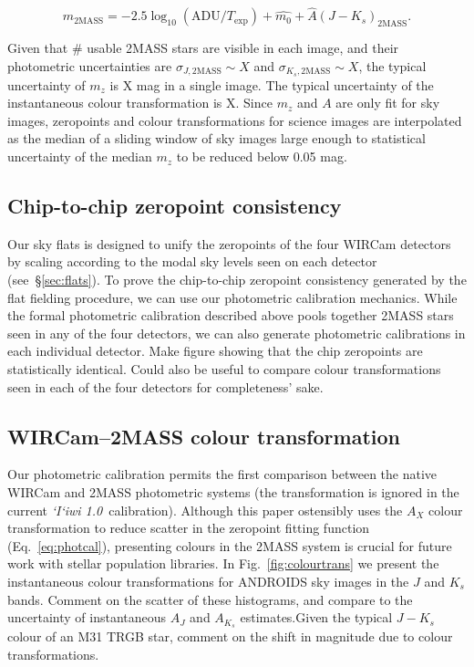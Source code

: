 \documentclass[iop]{emulateapj}
\newcommand{\sw}[1]{\textit{#1}} %
\newcommand{\iiwione}{\sw{`I`iwi 1.0}}
\newcommand{\todo}[1]{\textcolor{RedOrange}{#1}} %
\newcommand{\Fig}[1]{Fig.~\ref{fig:#1}}  %
\newcommand{\Eq}[1]{Eq.~\ref{eq:#1}}  %
\newcommand{\Sec}[1]{\S\ref{sec:#1}}  %
\begin{document}
\begin{equation}
  \label{eq:photcal}
  m_\mathrm{2MASS} = -2.5 \log_{10}(\mathrm{ADU}/T_\mathrm{exp}) + \hat{m_0} + \hat{A} (J-K_s)_\mathrm{2MASS}.
\end{equation}

Given that \todo{\#} usable 2MASS stars are visible in each image, and their photometric uncertainties are $\sigma_{J,\mathrm{2MASS}}\sim X$ and $\sigma_{K_s,\mathrm{2MASS}}\sim X$, the typical uncertainty of $m_z$ is \todo{X} mag in a single image. The typical uncertainty of the instantaneous colour transformation is \todo{X}. Since $m_z$ and $A$ are only fit for sky images, zeropoints and colour transformations for science images are interpolated as the median of a sliding window of sky images large enough to statistical uncertainty of the median $m_z$ to be reduced below 0.05 mag.

\subsection{Chip-to-chip zeropoint consistency}
\label{sec:chip_zp}

Our sky flats is designed to unify the zeropoints of the four WIRCam detectors by scaling according to the modal sky levels seen on each detector (see~\Sec{flats}).
To prove the chip-to-chip zeropoint consistency generated by the flat fielding procedure, we can use our photometric calibration mechanics.
While the formal photometric calibration described above pools together 2MASS stars seen in any of the four detectors, we can also generate photometric calibrations in each individual detector.
\todo{Make figure showing that the chip zeropoints are statistically identical. Could also be useful to compare colour transformations seen in each of the four detectors for completeness' sake.}

\subsection{WIRCam--2MASS colour transformation}
\label{sec:color_trans}

Our photometric calibration permits the first comparison between the native WIRCam and 2MASS photometric systems (the transformation is ignored in the current \iiwione\ calibration).
Although this paper ostensibly uses the $A_X$ colour transformation to reduce scatter in the zeropoint fitting function (\Eq{photcal}), presenting colours in the 2MASS system is crucial for future work with stellar population libraries.
In \Fig{colourtrans} we present the instantaneous colour transformations for ANDROIDS sky images in the $J$ and $K_s$ bands.
\todo{Comment on the scatter of these histograms, and compare to the uncertainty of instantaneous $A_J$ and $A_{K_s}$ estimates.Given the typical $J-K_s$ colour of an M31 TRGB star, comment on the shift in magnitude due to colour transformations.}
\end{document}
